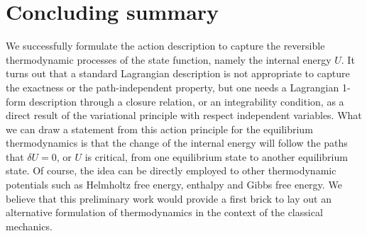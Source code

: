 \documentclass[12pt]{article}
\numberwithin{equation}{section}
\theoremstyle{remark}
\theoremstyle{definition}
\begin{document}
\section{Concluding summary}\label{SS}
We successfully formulate the action description to capture the reversible thermodynamic processes of the state function, namely the internal energy $U$. It turns out that a standard Lagrangian description is not appropriate to capture the exactness or the path-independent property, but one needs a Lagrangian 1-form description through a closure relation, or an integrability condition, as a direct result of the variational principle with respect independent variables. What we can draw a statement from this action principle for the equilibrium thermodynamics is that the change of the internal energy will follow the paths that $\delta U=0$, or $U$ is critical, from one equilibrium state to another equilibrium state. Of course, the idea can be directly employed to other thermodynamic potentials such as Helmholtz free energy, enthalpy and Gibbs free energy. We believe that this preliminary work would provide a first brick to lay out an alternative formulation of thermodynamics in the context of the classical mechanics.
%
%
\appendix
\end{document}
